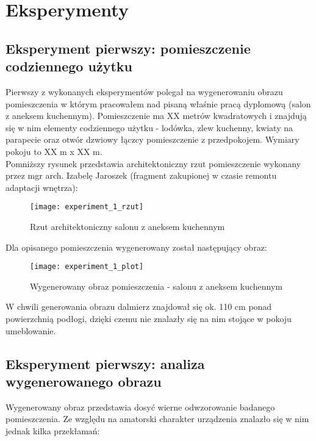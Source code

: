 \section {Eksperymenty}
\subsection {Eksperyment pierwszy: pomieszczenie codziennego użytku}
Pierwszy z wykonanych eksperymentów polegał na wygenerowaniu obrazu pomieszczenia w którym pracowałem nad pisaną właśnie pracą dyplomową (salon z aneksem kuchennym).
Pomieszczenie ma XX metrów kwadratowych i znajdują się w nim elementy codziennego użytku - lodówka, zlew kuchenny, kwiaty na parapecie oraz otwór dzwiowy łączcy pomieszczenie z przedpokojem. Wymiary pokoju to XX m x XX m.\\

Pomniższy rysunek przedstawia architektoniczny rzut pomieszczenie wykonany przez mgr arch. Izabelę Jaroszek (fragment zakupionej w czasie remontu adaptacji wnętrza):
\begin{figure}[h]
    \centering
    \texttt{[image: experiment\_1\_rzut]}
    \caption{Rzut architektoniczny salonu z aneksem kuchennym}
    \label{fig:experiment_1_rzut}
\end{figure}

Dla opisanego pomieszczenia wygenerowany został następujący obraz:
\begin{figure}[h]
    \centering
    \texttt{[image: experiment\_1\_plot]}
    \caption{Wygenerowany obraz pomieszczenia - salonu z aneksem kuchennym}
    \label{fig:experiment_1_plot}
\end{figure}

W chwili generowania obrazu dalmierz znajdował się ok. 110 cm ponad powierzchnią podłogi, dzięki czemu nie znalazły się na nim stojące w pokoju umeblowanie.

\subsection {Eksperyment pierwszy: analiza wygenerowanego obrazu}

Wygenerowany obraz przedstawia dosyć wierne odwzorowanie badanego pomieszczenia. Ze względu na amatorski charakter urządzenia znalazło się w nim jednak kilka przekłamań:

